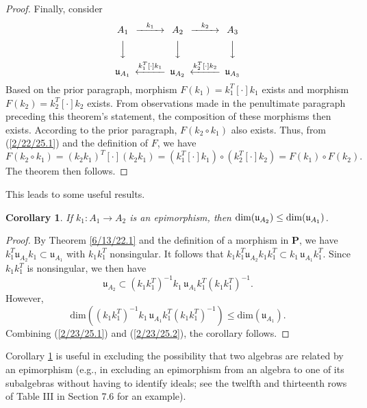 \documentclass{amsart}
\newtheorem{corollary}[theorem]{Corollary}
\theoremstyle{definition}
\numberwithin{theorem}{section}
\numberwithin{equation}{section}
\begin{document}
\begin{proof}
Finally, consider
      \[  \begin{CD}  
A_1 @>k_1>> A_2 @>k_2>> A_3\\
 @VVV   @VVV  @VVV\\
\mathfrak{u}_{A_1}   @<k_1^T[\cdot]k_1<<  \mathfrak{u}_{A_2}  @<k_2^T[\cdot]k_2<<  \mathfrak{u}_{A_3} \\ 
 \end{CD} \]
Based on the prior paragraph, morphism $F(k_1) = k_1^T[\cdot]k_1$ exists and morphism $F(k_2) = k_2^T[\cdot]k_2$ exists.  From observations made in the penultimate paragraph preceding this theorem's statement, the composition of these morphisms then exists.  According to the prior paragraph, $F(k_2\circ k_1)$ also exists.   Thus, from (\ref{2/22/25.1}) and the definition of $F$, we have \[ F(k_2\circ k_1) = (k_2k_1)^T[\cdot](k_2k_1) = (k_1^T[\cdot] k_1)\circ (k_2^T[\cdot]k_2)  = F(k_1)\circ F(k_2).\]   The theorem then follows.
\end{proof}

This leads to some useful results.  

\begin{corollary} \label{8/17/22.5} If $k_1:A_1\rightarrow A_2$ is an epimorphism, then ${\rm dim}(\mathfrak{u}_{A_2}) \le {\rm dim}(\mathfrak{u}_{A_1})$. \end{corollary}  

\begin{proof} By Theorem \ref{6/13/22.1} and the definition of a morphism in $\mathbf{P}$, we have \mbox{$k_1^T \mathfrak{u}_{A_2} k_1 \subset \mathfrak{u}_{A_1}$} with $k_1k_1^T$ nonsingular.  It follows that  $k_1k_1^T \mathfrak{u}_{A_2} k_1k_1^T \subset k_1\,\mathfrak{u}_{A_1}k_1^T$.  Since $k_1k_1^T$ is nonsingular, we then have 
\begin{equation}\label{2/23/25.1} \mathfrak{u}_{A_2} \subset (k_1k_1^T)^{-1}k_1\, \mathfrak{u}_{A_1} k_1^T(k_1k_1^T)^{-1}.\end{equation}  However, \begin{equation}\label{2/23/25.2}  \text{dim}\left((k_1k_1^T)^{-1}k_1 \,\mathfrak{u}_{A_1} k_1^T(k_1k_1^T)^{-1}\right) \le \text{dim}(\mathfrak{u}_{A_1}).\end{equation} Combining (\ref{2/23/25.1}) and (\ref{2/23/25.2}), the corollary follows.
   \end{proof}
   
  Corollary \ref{8/17/22.5} is useful in excluding the possibility that two algebras are related by an epimorphism (e.g., in excluding an epimorphism from an algebra to one of its subalgebras without having to identify ideals; see the twelfth and thirteenth rows of Table III in Section 7.6 for an example).
\end{document}
